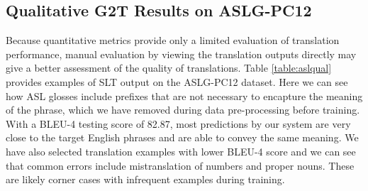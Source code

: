 \documentclass[11pt]{article}
\begin{document}
 \subsection{Qualitative G2T Results on ASLG-PC12}
 Because quantitative metrics provide only a limited evaluation of translation performance, manual evaluation by viewing the translation outputs directly may give a better assessment of the quality of translations. 
Table \ref{table:aslqual} provides examples of SLT output on the ASLG-PC12 dataset. Here we can see how ASL glosses include prefixes that are not necessary to encapture the meaning of the phrase, which we have removed during data pre-processing before training. With a BLEU-4 testing score of 82.87, most predictions by our system are very close to the target English phrases and are able to convey the same meaning. We have also selected translation examples with lower BLEU-4 score and we can see that common errors include mistranslation of numbers and proper nouns. These are likely corner cases with infrequent examples during training.
\end{document}
